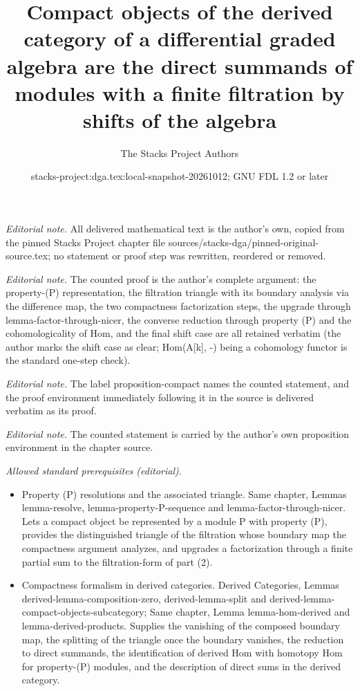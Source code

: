 \documentclass[10pt,a4paper]{amsart}
\title{Compact objects of the derived category of a differential graded algebra are the direct summands of modules with a finite filtration by shifts of the algebra}
\author{The Stacks Project Authors}
\date{stacks-project:dga.tex:local-snapshot-20261012; GNU FDL 1.2 or later}
\theoremstyle{plain}
\theoremstyle{definition}
\theoremstyle{remark}
\numberwithin{equation}{subsection}
\begin{document}
\maketitle
\noindent\textit{Editorial note.} All delivered mathematical text is the author's own, copied from the pinned Stacks Project chapter file sources/stacks-dga/pinned-original-source.tex; no statement or proof step was rewritten, reordered or removed.\par\medskip
\noindent\textit{Editorial note.} The counted proof is the author's complete argument: the property-(P) representation, the filtration triangle with its boundary analysis via the difference map, the two compactness factorization steps, the upgrade through lemma-factor-through-nicer, the converse reduction through property (P) and the cohomologicality of Hom, and the final shift case are all retained verbatim (the author marks the shift case as clear; Hom(A[k], -) being a cohomology functor is the standard one-step check).\par\medskip
\noindent\textit{Editorial note.} The label proposition-compact names the counted statement, and the proof environment immediately following it in the source is delivered verbatim as its proof.\par\medskip
\noindent\textit{Editorial note.} The counted statement is carried by the author's own proposition environment in the chapter source.\par\medskip
\noindent\textit{Allowed standard prerequisites (editorial).}\begin{itemize}
\item Property (P) resolutions and the associated triangle. Same chapter, Lemmas lemma-resolve, lemma-property-P-sequence and lemma-factor-through-nicer. Lets a compact object be represented by a module P with property (P), provides the distinguished triangle of the filtration whose boundary map the compactness argument analyzes, and upgrades a factorization through a finite partial sum to the filtration-form of part (2).
\item Compactness formalism in derived categories. Derived Categories, Lemmas derived-lemma-composition-zero, derived-lemma-split and derived-lemma-compact-objects-subcategory; Same chapter, Lemma lemma-hom-derived and lemma-derived-products. Supplies the vanishing of the composed boundary map, the splitting of the triangle once the boundary vanishes, the reduction to direct summands, the identification of derived Hom with homotopy Hom for property-(P) modules, and the description of direct sums in the derived category.
\end{itemize}\medskip
\end{document}
